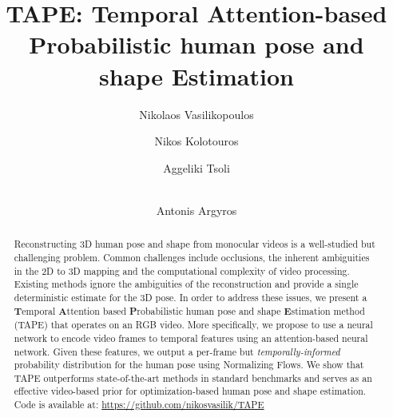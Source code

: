 \documentclass[runningheads]{llncs}
\begin{document}
\title{TAPE: Temporal Attention-based Probabilistic human pose and shape Estimation}


\author{Nikolaos Vasilikopoulos\and
Nikos Kolotouros\inst{} \and
Aggeliki Tsoli  \and \\
Antonis Argyros}




\maketitle             
\begin{abstract}
Reconstructing 3D human pose and shape from monocular videos is a well-studied but challenging problem. Common challenges include occlusions, the inherent ambiguities in the 2D to 3D mapping and the computational complexity of video processing. Existing methods ignore the ambiguities of the reconstruction and provide a single deterministic estimate for the 3D pose. In order to address these issues, we present a  \textbf{T}emporal \textbf{A}ttention based \textbf{P}robabilistic human pose and shape \textbf{E}stimation method (TAPE) that operates on an RGB video. More specifically, we propose to use a neural network to encode video frames to temporal features using an attention-based neural network. Given these features, we output a per-frame but \textit{temporally-informed} probability distribution for the human pose using Normalizing Flows. We show that TAPE outperforms state-of-the-art methods in standard benchmarks and serves as an effective video-based prior for optimization-based human pose and shape estimation. Code is available at: \url{https://github.com/nikosvasilik/TAPE}


\end{abstract}
\end{document}
